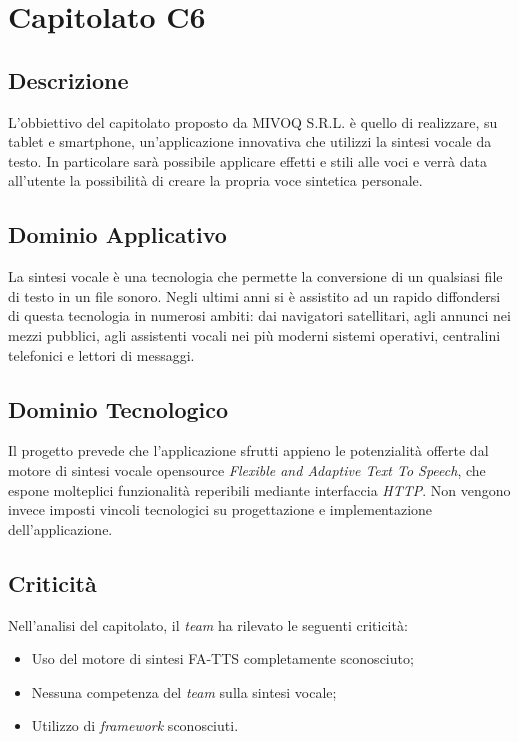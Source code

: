 \newpage
\section{Capitolato C6}
\subsection{Descrizione}
L'obbiettivo del capitolato proposto da MIVOQ S.R.L. è quello di realizzare, su tablet e smartphone, un'applicazione innovativa che utilizzi la sintesi vocale da testo. In particolare sarà possibile applicare effetti e stili alle voci e verrà data all'utente la possibilità di creare la propria voce sintetica personale.

\subsection{Dominio Applicativo}
La sintesi vocale è una tecnologia che permette la conversione di un qualsiasi file di testo in un file sonoro. Negli ultimi anni si è assistito ad un rapido diffondersi di questa tecnologia in numerosi ambiti: dai navigatori satellitari, agli annunci nei mezzi pubblici, agli assistenti vocali nei più moderni sistemi operativi, centralini telefonici e lettori di messaggi.

\subsection{Dominio Tecnologico}
Il progetto prevede che l'applicazione sfrutti appieno le potenzialità offerte dal motore di sintesi vocale opensource \textit{Flexible and Adaptive Text To Speech}, che espone molteplici funzionalità reperibili mediante interfaccia \textit{HTTP}. Non vengono invece imposti vincoli tecnologici su progettazione e implementazione dell'applicazione.

\subsection{Criticità}
Nell'analisi del capitolato, il \textit{team} ha rilevato le seguenti criticità:
\begin{itemize}
\item Uso del motore di sintesi FA-TTS completamente sconosciuto;
\item Nessuna competenza del \textit{team} sulla sintesi vocale;
\item Utilizzo di \textit{framework} sconosciuti.
\end{itemize}

